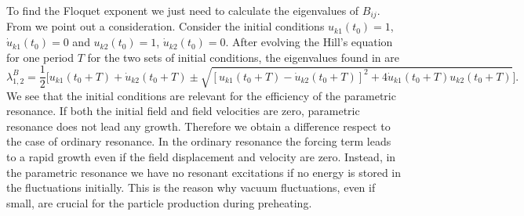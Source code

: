 \documentclass[11pt,a4paper,twoside]{book}
\begin{document}
To find the Floquet exponent we  just need to calculate the eigenvalues of $ B_{ij} $. From \cite{Chap4:Lozanov} we point out a consideration. Consider the initial conditions $ u_{k1}(t_{0}) = 1 $, $ \dot{u}_{k1}(t_{0})=0 $ and $ u_{k2}(t_{0}) = 1 $, $ \dot{u}_{k2}(t_{0})=0 $. After evolving the Hill's equation for one period $ T $ for the two sets of initial conditions, the eigenvalues found in \cite{Chap4:Lozanov} are 
\begin{equation}
\lambda_{1,2}^{B}=\frac{1}{2}\Bigg[u_{k1}(t_{0} + T) + \dot{u}_{k2}(t_{0} + T)  \pm \sqrt{[u_{k1}(t_{0} + T) - \dot{u}_{k2}(t_{0} + T)]^{2} + 4\dot{u}_{k1}(t_{0}+T)u_{k2}(t_{0} + T)}\Bigg].
\end{equation}
We see that the initial conditions are relevant for the efficiency of the parametric resonance. If both the initial field and field velocities are zero, parametric resonance does not lead any growth. Therefore we obtain a difference respect to the case of ordinary resonance. In the ordinary resonance the forcing term leads to a rapid growth even if the field displacement and velocity are zero. Instead, in the parametric resonance we have no resonant excitations if no energy is stored in the fluctuations initially. This is the reason why vacuum fluctuations, even if small, are crucial for the particle production during preheating.
\end{document}
